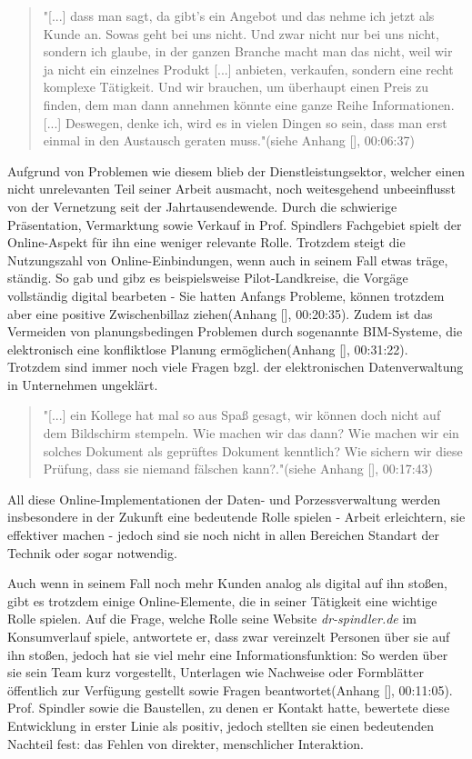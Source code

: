 \begin{folding}
\begin{quote}
"[...] dass man sagt, da gibt's ein Angebot und das nehme ich jetzt als Kunde an. Sowas geht bei uns nicht. Und zwar nicht nur bei uns nicht, sondern ich glaube, in der ganzen Branche macht man das nicht, weil wir ja nicht ein einzelnes Produkt [...] anbieten, verkaufen, sondern eine recht komplexe Tätigkeit. Und wir brauchen, um überhaupt einen Preis zu finden, dem man dann annehmen könnte eine ganze Reihe Informationen. [...] Deswegen, denke ich, wird es in vielen Dingen so sein, dass man erst einmal in den Austausch geraten muss."(siehe Anhang [], 00:06:37)
\end{quote} 
Aufgrund von Problemen wie diesem blieb der Dienstleistungsektor, welcher einen nicht unrelevanten Teil seiner Arbeit ausmacht, noch weitesgehend unbeeinflusst von der Vernetzung seit der Jahrtausendewende. Durch die schwierige Präsentation, Vermarktung sowie Verkauf in Prof. Spindlers Fachgebiet spielt der Online-Aspekt für ihn eine weniger relevante Rolle. Trotzdem steigt die Nutzungszahl von Online-Einbindungen, wenn auch in seinem Fall etwas träge, ständig. So gab und gibz es beispielsweise Pilot-Landkreise, die Vorgäge vollständig digital bearbeten - Sie hatten Anfangs Probleme, können trotzdem aber eine positive Zwischenbillaz ziehen(Anhang [], 00:20:35). Zudem ist das Vermeiden von planungsbedingen Problemen durch sogenannte \ac{BIM}-Systeme, die elektronisch eine konfliktlose Planung ermöglichen(Anhang [], 00:31:22). Trotzdem sind immer noch viele Fragen bzgl. der elektronischen Datenverwaltung in Unternehmen ungeklärt.

\begin{quote}
"[...] ein Kollege hat mal so aus Spaß gesagt, wir können doch nicht auf dem Bildschirm stempeln. Wie machen wir das dann? Wie machen wir ein solches Dokument als geprüftes Dokument kenntlich? Wie sichern wir diese Prüfung, dass sie niemand fälschen kann?."(siehe Anhang [], 00:17:43)
\end{quote} 
All diese Online-Implementationen der Daten- und Porzessverwaltung werden insbesondere in der Zukunft eine bedeutende Rolle spielen - Arbeit erleichtern, sie effektiver machen - jedoch sind sie noch nicht in allen Bereichen Standart der Technik oder sogar notwendig.

Auch wenn in seinem Fall noch mehr Kunden analog als digital auf ihn stoßen, gibt es trotzdem einige Online-Elemente, die in seiner Tätigkeit eine wichtige Rolle spielen. Auf die Frage, welche Rolle seine Website \emph{dr-spindler.de} im Konsumverlauf spiele, antwortete er, dass zwar vereinzelt Personen über sie auf ihn stoßen, jedoch hat sie viel mehr eine Informationsfunktion: So werden über sie sein Team kurz vorgestellt, Unterlagen wie Nachweise oder Formblätter öffentlich zur Verfügung gestellt sowie Fragen beantwortet(Anhang [], 00:11:05). Prof. Spindler sowie die Baustellen, zu denen er Kontakt hatte, bewertete diese Entwicklung in erster Linie als positiv, jedoch stellten sie einen bedeutenden Nachteil fest: das Fehlen von direkter, menschlicher Interaktion. 






\end{folding}
